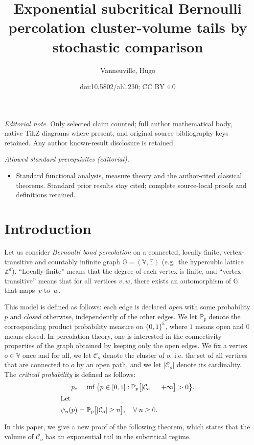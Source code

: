 \documentclass[10pt]{amsart}
\title{Exponential subcritical Bernoulli percolation cluster-volume tails by stochastic comparison}
\author{Vanneuville, Hugo}
\date{doi:10.5802/ahl.230; CC BY 4.0}
\theoremstyle{definition}\newtheorem{defi}[theo]{Definition}\newtheorem{rema}[theo]{Remark}\newtheorem{exam}[theo]{Example}\newtheorem{exem}[theo]{Example}\newtheorem{nota}[theo]{Notation}
\newcommand{\E}{\mathbb{E}}
\newcommand{\G}{\mathbb{G}}
\newcommand{\V}{\mathbb{V}}
\newcommand{\Z}{\mathbb{Z}}
\newcommand{\Pro}{\mathbb{P}}
\newcommand{\calC}{\mathcal{C}}
\let\oldforall\forall
\renewcommand*{\forall}{\mathrel{\oldforall}}
\begin{document}
\maketitle
\noindent\textit{Editorial note.} Only selected claim counted; full author mathematical body, native TikZ diagrams where present, and original source bibliography keys retained. Any author known-result disclosure is retained.\par\medskip
\noindent\textit{Allowed standard prerequisites (editorial).}\begin{itemize}
\item Standard functional analysis, measure theory and the author-cited classical theorems. Standard prior results stay cited; complete source-local proofs and definitions retained.
\end{itemize}\medskip

\section{Introduction}

Let us consider \emph{Bernoulli bond percolation} on a connected, locally finite, vertex-transitive and countably infinite graph $\G=(\V,\E)$ (e.g.\ the hypercubic lattice $\Z^d$). ``Locally finite'' means that the degree of each vertex is finite, and ``vertex-transitive'' means that for all vertices $v,w$, there exists an automorphism of $\G$ that maps~$v$ to~$w$.


This model is defined as follows: each edge is declared \emph{open} with some probability $p$ and \emph{closed} otherwise, independently of the other edges. We let $\Pro_p$ denote the corresponding product probability measure on $\{0,1\}^{\E}$, where $1$ means open and $0$ means closed. In percolation theory, one is interested in the connectivity properties of the graph obtained by keeping only the open edges. We fix a vertex $o \in \V$ once and for all, we let $\calC_o$ denote the cluster of $o$, i.e. the set of all vertices that are connected to $o$ by an open path, and we let $|\calC_o|$ denote its cardinality. The \emph{critical probability} is defined as follows:
\begin{align*}
p_c &= \inf \big\{ p \in [0,1] : \Pro_p\big[|\calC_o|=+\infty\big]>0 \big\}.
\\
\intertext{Let}
\psi_n(p) &= \Pro_p\big[|\calC_o| \ge n\big], \quad \forall n \ge 0.
\end{align*}

In this paper, we give a new proof of the following theorem, which states that the volume of $\calC_o$ has an exponential tail in the subcritical regime.
\end{document}
